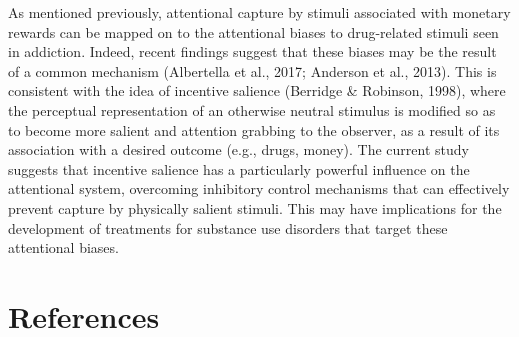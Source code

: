 \documentclass[man, a4paper, noextraspace, 11pt,floatsintext]{apa6}
\theoremstyle{definition}
\theoremstyle{definition}
\theoremstyle{definition}
\theoremstyle{remark}
\begin{document}
As mentioned previously, attentional capture by stimuli associated with
monetary rewards can be mapped on to the attentional biases to
drug-related stimuli seen in addiction. Indeed, recent findings suggest
that these biases may be the result of a common mechanism (Albertella et
al., 2017; Anderson et al., 2013). This is consistent with the idea of
incentive salience (Berridge \& Robinson, 1998), where the perceptual
representation of an otherwise neutral stimulus is modified so as to
become more salient and attention grabbing to the observer, as a result
of its association with a desired outcome (e.g., drugs, money). The
current study suggests that incentive salience has a particularly
powerful influence on the attentional system, overcoming inhibitory
control mechanisms that can effectively prevent capture by physically
salient stimuli. This may have implications for the development of
treatments for substance use disorders that target these attentional
biases.



























































\newpage

\section{References}\label{references}

\begingroup
\setlength{\parindent}{-0.5in} \setlength{\leftskip}{0.5in}
\end{document}
